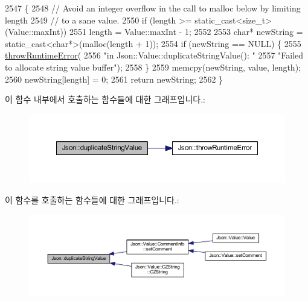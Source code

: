 \begin{DoxyCode}
2547 \{
2548   \textcolor{comment}{// Avoid an integer overflow in the call to malloc below by limiting length}
2549   \textcolor{comment}{// to a sane value.}
2550   \textcolor{keywordflow}{if} (length >= static\_cast<size\_t>(Value::maxInt))
2551     length = Value::maxInt - 1;
2552 
2553   \textcolor{keywordtype}{char}* newString = \textcolor{keyword}{static\_cast<}\textcolor{keywordtype}{char}*\textcolor{keyword}{>}(malloc(length + 1));
2554   \textcolor{keywordflow}{if} (newString == NULL) \{
2555     \hyperlink{namespace_json_a0ab7ff7f99788262d92d9ff3d924e065}{throwRuntimeError}(
2556         \textcolor{stringliteral}{"in Json::Value::duplicateStringValue(): "}
2557         \textcolor{stringliteral}{"Failed to allocate string value buffer"});
2558   \}
2559   memcpy(newString, value, length);
2560   newString[length] = 0;
2561   \textcolor{keywordflow}{return} newString;
2562 \}
\end{DoxyCode}
이 함수 내부에서 호출하는 함수들에 대한 그래프입니다.\+:\nopagebreak
\begin{figure}[H]
\begin{center}
\leavevmode
\includegraphics[width=350pt]{namespace_json_a678ac3a60cd70ec0fb4c9abfd40eb0c4_cgraph}
\end{center}
\end{figure}
이 함수를 호출하는 함수들에 대한 그래프입니다.\+:
\nopagebreak
\begin{figure}[H]
\begin{center}
\leavevmode
\includegraphics[width=350pt]{namespace_json_a678ac3a60cd70ec0fb4c9abfd40eb0c4_icgraph}
\end{center}
\end{figure}
\mbox{\label{namespace_json_aa208904144dc7b11ccc28f47c9afab9a}} 
